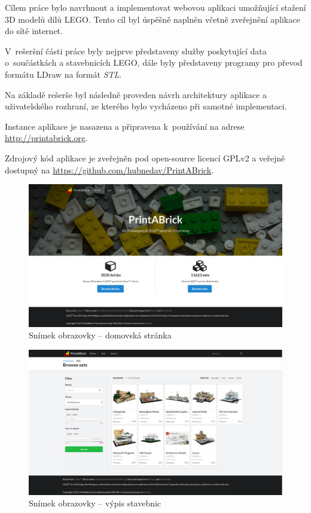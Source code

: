 Cílem práce bylo navrhnout a implementovat webovou aplikaci umožňující stažení 3D modelů dílů LEGO. Tento cíl byl úspěšně naplněn včetně zveřejnění aplikace do sítě internet. 

V~rešeršní části práce byly nejprve představeny služby poskytující data o~sou\-část\-kách a stavebnicích LEGO, dále byly představeny programy pro převod formátu LDraw na formát \textit{STL}.

Na základě rešerše byl následně proveden návrh architektury aplikace a uži\-va\-tel\-ské\-ho rozhraní, ze kterého bylo vycházeno při samotné implementaci. 

Instance aplikace je nasazena a připravena k~používání na adrese \url{http://printabrick.org}. 

Zdrojový kód aplikace je zveřejněn pod open-source licencí \gls{GPLv2} \autocite{GPLv2} a veřejně dostupný na \url{https://github.com/hubnedav/PrintABrick}.

\begin{figure}[htbp]
    \centering
    \includegraphics[width=\textwidth,height=\textheight,keepaspectratio]{images/screenshot-homepage.png}
    \caption{Snímek obrazovky – domovská stránka\label{facebook-share}}
\end{figure}

\begin{figure}[htbp]
    \centering
    \includegraphics[width=\textwidth,height=\textheight,keepaspectratio]{images/screenshot-sets.png}
    \caption{Snímek obrazovky – výpis stavebnic\label{facebook-share}}
\end{figure}

